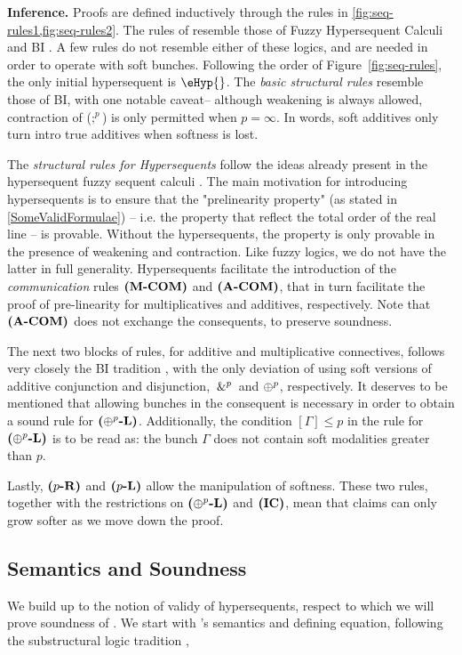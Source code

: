 \textbf{Inference.} Proofs are defined inductively through the rules in \cref{fig:seq-rules1,fig:seq-rules2}. The rules of \OL{} resemble those of Fuzzy Hypersequent Calculi \citep{prooffuzzy} and BI \citep{o1999logic}.  A few rules do not resemble either of these logics, and are needed in order to operate with soft bunches.  Following the order of Figure~\ref{fig:seq-rules}, the only initial hypersequent is $\eHyp{}$. The \emph{basic structural rules} resemble those of BI, with one notable caveat-- although weakening is always allowed, contraction of ($;^{p}$) is only permitted when $p = \infty$. In words, soft additives only turn intro true additives when softness is lost. 

The \emph{structural rules for Hypersequents} follow the ideas already present in the hypersequent fuzzy sequent calculi \citep{prooffuzzy}. The main motivation for introducing hypersequents is to ensure that the "prelinearity property" (as stated in \cref{SomeValidFormulae}) -- i.e. the property that reflect the total order of the real line --  is provable. Without the hypersequents, the property is only provable in the presence of weakening and contraction. Like fuzzy logics, we do not have the latter in full generality. Hypersequents facilitate the introduction of the \emph{communication} rules ${\normalfont \textbf{(M-COM)}}$ and ${\normalfont \textbf{(A-COM)}}$, that in turn facilitate the proof of pre-linearity for multiplicatives and additives, respectively. Note that ${\normalfont \textbf{(A-COM)}}$ does not exchange the consequents, to preserve soundness. 

The next two blocks of rules, for additive and multiplicative connectives, follows very closely the BI tradition \citep{o1999logic, 10.1145/3497775.3503690}, with the only deviation of using soft versions of additive conjunction and disjunction, $\,\&^{p}\,$ and $\oplus^{p}$, respectively. It deserves to be mentioned that allowing bunches in the consequent is necessary in order to obtain a sound rule for ${\normalfont \textbf{($\oplus^{p}$-L)}}$. Additionally, the condition $[\Gamma] \leq p$ in the rule for  ${\normalfont \textbf{($\oplus^{p}$-L)}}$ is to be read as: the bunch $\Gamma$ does not contain soft modalities greater than $p$.

Lastly, ${\normalfont \textbf{($p$-R)}}$ and ${\normalfont \textbf{($p$-L)}}$ allow the manipulation of softness. These two rules, together with the restrictions on ${\normalfont \textbf{($\oplus^{p}$-L)}}$ and ${\normalfont \textbf{(IC)}}$, mean that claims can only grow softer as we move down the proof.  



\subsection{Semantics and Soundness}
\label{section:soundness}
We build up to the notion of validy of hypersequents, respect to which we will prove soundness of \OL{}. We start with \OL{}'s semantics and defining equation, following the substructural logic tradition \citep{galatos2007residuated},

